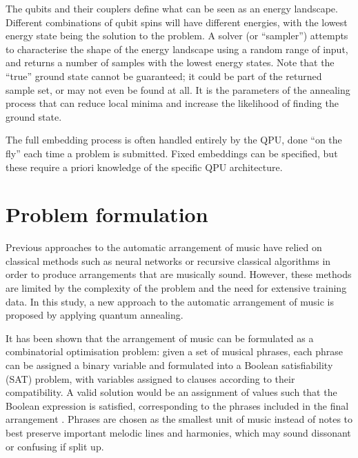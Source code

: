 \documentclass[aps,pra,12pt,onecolumn]{revtex4-2}
\begin{document}
The qubits and their couplers define what can be seen as an energy landscape. Different combinations of qubit spins will have different energies, with the lowest energy state being the solution to the problem. A solver (or ``sampler'') attempts to characterise the shape of the energy landscape using a random range of input, and returns a number of samples with the lowest energy states. Note that the ``true'' ground state cannot be guaranteed; it could be part of the returned sample set, or may not even be found at all. It is the parameters of the annealing process that can reduce local minima and increase the likelihood of finding the ground state.

The full embedding process is often handled entirely by the QPU, done ``on the fly'' each time a problem is submitted. Fixed embeddings can be specified, but these require a priori knowledge of the specific QPU architecture. 

\section{Problem formulation}

Previous approaches to the automatic arrangement of music have relied on classical methods such as neural networks \cite{hoshi_versatile_2022} or recursive classical algorithms \cite{huang_towards_2012} in order to produce arrangements that are musically sound. However, these methods are limited by the complexity of the problem and the need for extensive training data. In this study, a new approach to the automatic arrangement of music is proposed by applying quantum annealing.

It has been shown that the arrangement of music can be formulated as a combinatorial optimisation problem: given a set of musical phrases, each phrase can be assigned a binary variable and formulated into a Boolean satisfiability (SAT) problem, with variables assigned to clauses according to their compatibility. A valid solution would be an assignment of values such that the Boolean expression is satisfied, corresponding to the phrases included in the final arrangement \cite{moses_computational_2016}. Phrases are chosen as the smallest unit of music instead of notes to best preserve important melodic lines and harmonies, which may sound dissonant or confusing if split up.
\end{document}
